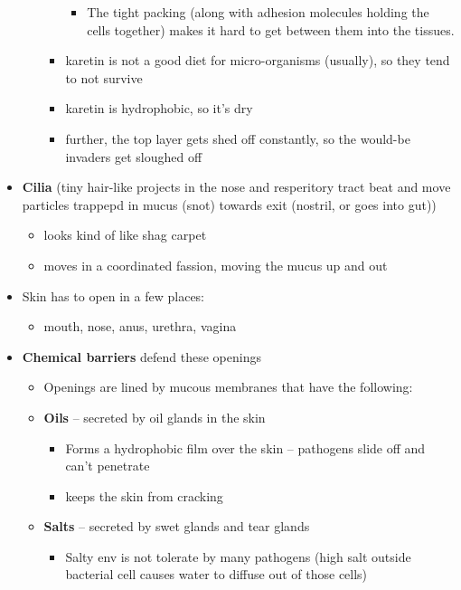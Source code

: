 \documentclass{article}
\theoremstyle{definition}
\begin{document}
\begin{itemize}
\begin{itemize}
\begin{itemize}
\begin{itemize}
							\item The tight packing (along with adhesion molecules holding the cells together) makes it hard to get between them into the tissues.
						\end{itemize}
					\item karetin is not a good diet for micro-organisms (usually), so they tend to not survive
					\item karetin is hydrophobic, so it's dry
					\item further, the top layer gets shed off constantly, so the would-be invaders get sloughed off
				\end{itemize}
		\end{itemize}
	\item \textbf{Cilia}  (tiny hair-like projects in the nose and resperitory tract beat and move particles trappepd in mucus (snot) towards exit (nostril, or goes into gut))
		\begin{itemize}
			\item looks kind of like shag carpet
			\item moves in a coordinated fassion, moving  the mucus up and out
		\end{itemize}
	\item Skin has to open in a few places:
		\begin{itemize}
			\item mouth, nose, anus, urethra, vagina
		\end{itemize}
	\item \textbf{Chemical barriers} defend these openings
		\begin{itemize}
			\item Openings are lined by mucous membranes that have the following:
			\item \textbf{Oils} -- secreted by oil glands in the skin
				\begin{itemize}
					\item Forms a hydrophobic film over the skin -- pathogens slide off and can't penetrate
					\item keeps the skin from cracking
				\end{itemize}
			\item \textbf{Salts} -- secreted by swet glands and tear glands
				\begin{itemize}
					\item Salty env is not tolerate by many pathogens (high salt outside bacterial cell causes water to diffuse out of those cells)
				\end{itemize}

\end{itemize}
\end{itemize}
\end{document}
